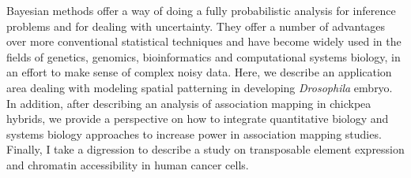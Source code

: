 Bayesian methods offer a way of doing a fully probabilistic analysis for inference problems and for dealing with uncertainty. 
They offer a number of advantages over more conventional statistical techniques and have become widely used in the fields of genetics, genomics, bioinformatics and computational systems biology, in an effort to make sense of complex noisy data. 
Here, we describe an application area dealing with modeling spatial patterning in developing \textit{Drosophila} embryo.
In addition, after describing an analysis of association mapping in chickpea hybrids, we provide a perspective on how to integrate quantitative biology and systems biology approaches to increase power in association mapping studies.
Finally, I take a digression to describe a study on transposable element expression and chromatin accessibility in human cancer cells. 
